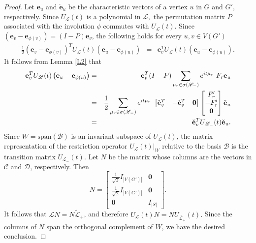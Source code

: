 \documentclass[10pt,a4paper]{amsart}
\def \e {{\mathbf e}}
\def \o {{\bf 0}}
\newcommand{\ob}[1]{\left(#1\right)}
\begin{document}
\begin{proof}
Let $\e_u$ and $\check{\e}_u$ be the characteristic vectors of a vertex $u$ in $G$ and $G',$ respectively. Since $U_\mathscr{L}(t)$ is a polynomial in $\mathscr{L},$ the permutation matrix $P$ associated with the involution $\phi$ commutes with $U_\mathscr{L}(t).$ Since $\ob{\e_v-\e_{\phi(v)}}=\ob{I-P}\e_v$, the following holds for every $u,v\in V\ob{G'}$
\begin{eqnarray*}
 \frac{1}{2}\ob{\e_v-\e_{\phi(v)}}^T U_\mathscr{L}(t)\ob{\e_u-\e_{\phi(u)}} 
 &=& \e_v^TU_\mathscr{L}(t)\ob{\e_u-\e_{\phi(u)}}.
\end{eqnarray*}
It follows from Lemma \ref{L2} that
\begin{eqnarray*}
  \e_v^TU_\mathscr{L}(t)\ob{\e_u-\e_{\phi(u)}} &=& \e_v^T(I-P)\sum_{\mu_r \in \sigma(\mathscr{L}_-)}e^{it\mu_r}~F_r\e_u\\
  &=& \frac{1}{2}\sum_{\mu_r \in \sigma(\mathscr{L}_-)}e^{it\mu_r}~ \begin{bmatrix}
      \check{\e}_v^T& -\check{\e}_v^T& \o
  \end{bmatrix} \begin{bmatrix}
   F_r'\\
   -F_r'\\
   \o
  \end{bmatrix}\check{\e}_u\\
  &=& \check{\e}_v^T U_{\mathscr{L}_-}(t) \check{\e}_u.
\end{eqnarray*}
Since $W = \text{span}(\mathcal{B})$ is an invariant subspace of $U_{\mathscr{L}}(t)$, the matrix representation of the restriction operator $U_{\mathscr{L}}(t)|_W$ relative to the basis $\mathcal{B}$ is the transition matrix $U_{\mathscr{L}_-}(t)$. Let $N$ be the matrix whose columns are the vectors in $\mathcal{C}$ and $\mathcal{D}$, respectively. Then
\[
N = \begin{bmatrix}
\frac{1}{\sqrt{2}} I_{|V(G')|} & \mathbf{0} \\
\frac{1}{\sqrt{2}} I_{|V(G')|} & \mathbf{0} \\
\mathbf{0} & I_{|S|}
\end{bmatrix}.
\]
It follows that $\mathscr{L}N=N\widetilde{\mathscr{L}}_+$, and therefore $U_\mathscr{L}(t)N=NU_{\widetilde{\mathscr{L}_+}}(t).$ Since the columns of $N$ span the orthogonal complement of $W$, we have the desired conclusion.
\end{proof}
\end{document}
